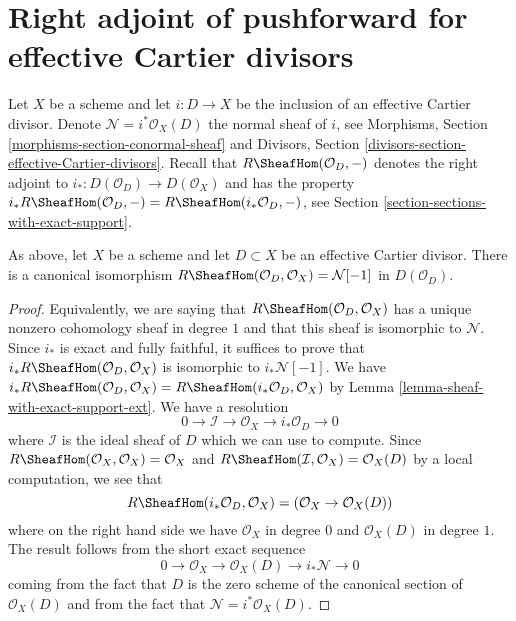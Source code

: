 \section{Right adjoint of pushforward for effective Cartier divisors}
\label{section-dualizing-Cartier}

\noindent
Let $X$ be a scheme and let $i : D \to X$ be the inclusion of an
effective Cartier divisor. Denote $\mathcal{N} = i^*\mathcal{O}_X(D)$
the normal sheaf of $i$, see
Morphisms, Section \ref{morphisms-section-conormal-sheaf}
and
Divisors, Section \ref{divisors-section-effective-Cartier-divisors}.
Recall that $R\SheafHom(\mathcal{O}_D, -)$
denotes the right adjoint to $i_* : D(\mathcal{O}_D) \to D(\mathcal{O}_X)$
and has the property
$i_*R\SheafHom(\mathcal{O}_D, -) = R\SheafHom(i_*\mathcal{O}_D, -)$,
see Section \ref{section-sections-with-exact-support}.

\begin{lemma}
\label{lemma-compute-for-effective-Cartier}
As above, let $X$ be a scheme and let $D \subset X$ be an
effective Cartier divisor. There is a canonical isomorphism
$R\SheafHom(\mathcal{O}_D, \mathcal{O}_X) = \mathcal{N}[-1]$
in $D(\mathcal{O}_D)$.
\end{lemma}

\begin{proof}
Equivalently, we are saying that $R\SheafHom(\mathcal{O}_D, \mathcal{O}_X)$
has a unique nonzero cohomology sheaf in degree $1$ and that this
sheaf is isomorphic to $\mathcal{N}$. Since $i_*$ is exact and fully
faithful, it suffices to prove that
$i_*R\SheafHom(\mathcal{O}_D, \mathcal{O}_X)$ is isomorphic
to $i_*\mathcal{N}[-1]$. We have
$i_*R\SheafHom(\mathcal{O}_D, \mathcal{O}_X) =
R\SheafHom(i_*\mathcal{O}_D, \mathcal{O}_X)$
by Lemma \ref{lemma-sheaf-with-exact-support-ext}. We have a resolution
$$
0 \to \mathcal{I} \to \mathcal{O}_X \to i_*\mathcal{O}_D \to 0
$$
where $\mathcal{I}$ is the ideal sheaf of $D$
which we can use to compute. Since
$R\SheafHom(\mathcal{O}_X, \mathcal{O}_X) = \mathcal{O}_X$ and
$R\SheafHom(\mathcal{I}, \mathcal{O}_X) = \mathcal{O}_X(D)$ by
a local computation, we see that
$$
R\SheafHom(i_*\mathcal{O}_D, \mathcal{O}_X) =
(\mathcal{O}_X \to \mathcal{O}_X(D))
$$
where on the right hand side we have $\mathcal{O}_X$ in degree $0$
and $\mathcal{O}_X(D)$ in degree $1$. The result follows from the
short exact sequence
$$
0 \to \mathcal{O}_X \to \mathcal{O}_X(D) \to i_*\mathcal{N} \to 0
$$
coming from the fact that $D$ is the zero scheme of the canonical section
of $\mathcal{O}_X(D)$ and from the fact that
$\mathcal{N} = i^*\mathcal{O}_X(D)$.
\end{proof}

